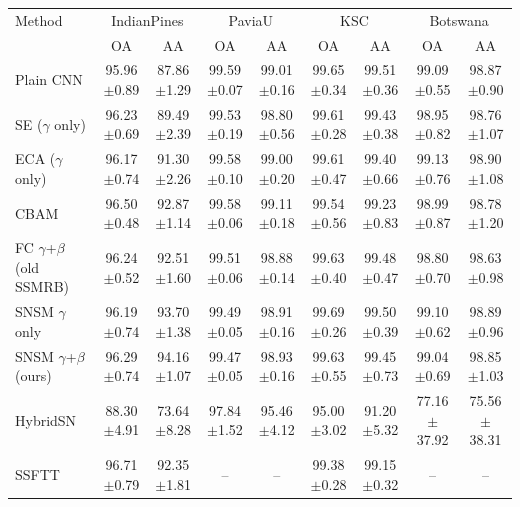 \begin{tabular}{lcccccccc}
\toprule
Method & \multicolumn{2}{c}{IndianPines} & \multicolumn{2}{c}{PaviaU} & \multicolumn{2}{c}{KSC} & \multicolumn{2}{c}{Botswana} \\
 & OA & AA & OA & AA & OA & AA & OA & AA \\
\midrule
Plain CNN & 95.96$\pm$0.89 & 87.86$\pm$1.29 & 99.59$\pm$0.07 & 99.01$\pm$0.16 & 99.65$\pm$0.34 & 99.51$\pm$0.36 & 99.09$\pm$0.55 & 98.87$\pm$0.90 \\
SE ($\gamma$ only) & 96.23$\pm$0.69 & 89.49$\pm$2.39 & 99.53$\pm$0.19 & 98.80$\pm$0.56 & 99.61$\pm$0.28 & 99.43$\pm$0.38 & 98.95$\pm$0.82 & 98.76$\pm$1.07 \\
ECA ($\gamma$ only) & 96.17$\pm$0.74 & 91.30$\pm$2.26 & 99.58$\pm$0.10 & 99.00$\pm$0.20 & 99.61$\pm$0.47 & 99.40$\pm$0.66 & 99.13$\pm$0.76 & 98.90$\pm$1.08 \\
CBAM & 96.50$\pm$0.48 & 92.87$\pm$1.14 & 99.58$\pm$0.06 & 99.11$\pm$0.18 & 99.54$\pm$0.56 & 99.23$\pm$0.83 & 98.99$\pm$0.87 & 98.78$\pm$1.20 \\
FC $\gamma$+$\beta$ (old SSMRB) & 96.24$\pm$0.52 & 92.51$\pm$1.60 & 99.51$\pm$0.06 & 98.88$\pm$0.14 & 99.63$\pm$0.40 & 99.48$\pm$0.47 & 98.80$\pm$0.70 & 98.63$\pm$0.98 \\
SNSM $\gamma$ only & 96.19$\pm$0.74 & 93.70$\pm$1.38 & 99.49$\pm$0.05 & 98.91$\pm$0.16 & 99.69$\pm$0.26 & 99.50$\pm$0.39 & 99.10$\pm$0.62 & 98.89$\pm$0.96 \\
SNSM $\gamma$+$\beta$ (ours) & 96.29$\pm$0.74 & 94.16$\pm$1.07 & 99.47$\pm$0.05 & 98.93$\pm$0.16 & 99.63$\pm$0.55 & 99.45$\pm$0.73 & 99.04$\pm$0.69 & 98.85$\pm$1.03 \\
HybridSN & 88.30$\pm$4.91 & 73.64$\pm$8.28 & 97.84$\pm$1.52 & 95.46$\pm$4.12 & 95.00$\pm$3.02 & 91.20$\pm$5.32 & 77.16$\pm$37.92 & 75.56$\pm$38.31 \\
SSFTT & 96.71$\pm$0.79 & 92.35$\pm$1.81 & -- & -- & 99.38$\pm$0.28 & 99.15$\pm$0.32 & -- & -- \\
\bottomrule
\end{tabular}